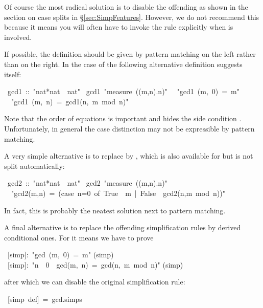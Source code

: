 \begin{isabelle}
\begin{isamarkuptext}
Of course the most radical solution is to disable the offending
 as shown in the section on case splits in
\S\ref{sec:SimpFeatures}.
However, we do not recommend this because it means you will often have to
invoke the rule explicitly when  is involved.

If possible, the definition should be given by pattern matching on the left
rather than  on the right. In the case of  the
following alternative definition suggests itself:%
\end{isamarkuptext}%
~gcd1~::~{"}nat*nat~{\isasymRightarrow}~nat{"}\isanewline
{}~gcd1~{"}measure~({\isasymlambda}(m,n).n){"}\isanewline
~~{"}gcd1~(m,~0)~=~m{"}\isanewline
~~{"}gcd1~(m,~n)~=~gcd1(n,~m~mod~n){"}%
\begin{isamarkuptext}%
\noindent
Note that the order of equations is important and hides the side condition
. Unfortunately, in general the case distinction
may not be expressible by pattern matching.

A very simple alternative is to replace  by , which
is also available for  but is not split automatically:%
\end{isamarkuptext}%
~gcd2~::~{"}nat*nat~{\isasymRightarrow}~nat{"}\isanewline
{}~gcd2~{"}measure~({\isasymlambda}(m,n).n){"}\isanewline
~~{"}gcd2(m,n)~=~(case~n=0~of~True~{\isasymRightarrow}~m~|~False~{\isasymRightarrow}~gcd2(n,m~mod~n)){"}%
\begin{isamarkuptext}%
\noindent
In fact, this is probably the neatest solution next to pattern matching.

A final alternative is to replace the offending simplification rules by
derived conditional ones. For  it means we have to prove%
\end{isamarkuptext}%
~[simp]:~{"}gcd~(m,~0)~=~m{"}\isanewline
{}(simp)\isanewline
{}~[simp]:~{"}n~{\isasymnoteq}~0~{\isasymLongrightarrow}~gcd(m,~n)~=~gcd(n,~m~mod~n){"}\isanewline
{}(simp)%
\begin{isamarkuptext}%
\noindent
after which we can disable the original simplification rule:%
\end{isamarkuptext}%
~[simp~del]~=~gcd.simps\isanewline
\end{isabelle}%
